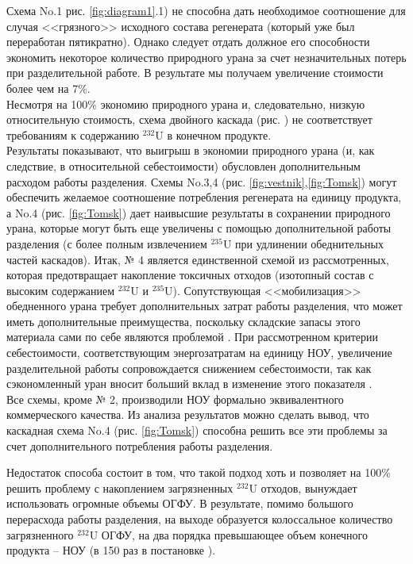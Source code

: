 Схема No.1 рис. \ref{fig:diagram1}.1)  не способна дать необходимое соотношение для случая <<грязного>> исходного состава регенерата (который уже был переработан пятикратно).
Однако следует отдать должное его способности экономить некоторое количество природного урана за счет незначительных потерь при разделительной работе.
В результате мы получаем увеличение стоимости более чем на 7\%. \\
Несмотря на 100\% экономию природного урана и, следовательно, низкую относительную стоимость, схема двойного каскада (рис. ) не соответствует требованиям к содержанию $^{232}$U в конечном продукте.\\
Результаты показывают, что выигрыш в экономии природного урана (и, как следствие, в относительной себестоимости) обусловлен дополнительным расходом работы разделения.
Схемы No.3,4 (рис. \ref{fig:vestnik},\ref{fig:Tomsk}) могут обеспечить желаемое соотношение потребления регенерата на единицу продукта, а No.4 (рис. \ref{fig:Tomsk}) дает наивысшие результаты в сохранении природного урана, которые могут быть еще увеличены с помощью дополнительной работы разделения (с более полным извлечением $^{235}$U при удлинении обеднительных частей каскадов).
Итак, № 4 является единственной схемой из рассмотренных, которая предотвращает накопление токсичных отходов (изотопный состав с высоким содержанием $^{232}$U и $^{235}$U).
Сопутствующая <<мобилизация>> обедненного урана требует дополнительных затрат работы разделения, что может иметь дополнительные преимущества, поскольку складские запасы этого материала сами по себе являются проблемой \cite{fitchOPTIONSDISPOSALREAPPLICATION2009}.
При рассмотренном критерии себестоимости, соответствующим энергозатратам на единицу НОУ, увеличение разделительной работы сопровождается снижением себестоимости, так как сэкономленный уран вносит больший вклад в изменение этого показателя \cite{gusevMultycascadeEnrichmentSchemes2020}. \\
Все схемы, кроме № 2, производили НОУ формально эквивалентного коммерческого качества.
Из анализа результатов можно сделать вывод, что каскадная схема No.4 (рис. \ref{fig:Tomsk}) способна решить все эти проблемы за счет дополнительного потребления работы разделения.


Недостаток способа состоит в том, что такой подход хоть и позволяет на 100\% решить проблему с накоплением загрязненных $^{232}$U отходов, вынуждает использовать огромные объемы ОГФУ. В результате, помимо большого перерасхода работы разделения, на выходе образуется колоссальное количество загрязненного $^{232}$U ОГФУ, на два порядка превышающее объем конечного продукта -- НОУ (в 150 раз в постановке \cite{smirnovMethodEnrichReprocessed2019}).


